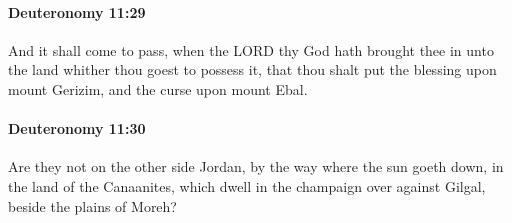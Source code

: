 		\paragraph{Deuteronomy 11:29} %
			\label{DEUTERONOMY-11-29}

			And it shall come to pass, when the LORD thy God hath brought thee in unto the land whither thou goest to possess it, that thou shalt put the blessing upon mount Gerizim, and the curse upon mount Ebal.


		\paragraph{Deuteronomy 11:30} %
			\label{DEUTERONOMY-11-30}

			Are they not on the other side Jordan, by the way where the sun goeth down, in the land of the Canaanites, which dwell in the champaign over against Gilgal, beside the plains of Moreh?

